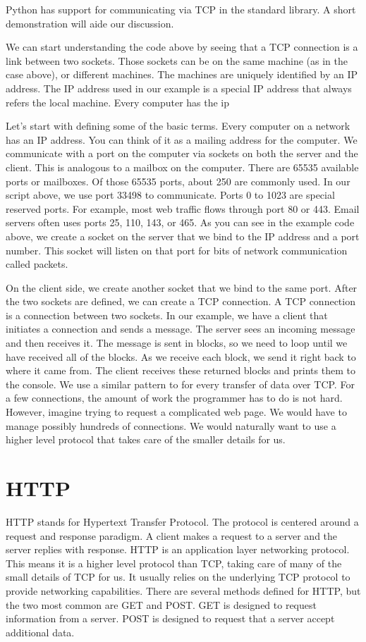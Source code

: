 Python has support for communicating via TCP in the standard library.
A short demonstration will aide our discussion.




We can start understanding the code above by seeing that a TCP connection is a link between two sockets.
Those sockets can be on the same machine (as in the case above), or different machines.
The machines are uniquely identified by an IP address.
The IP address used in our example is a special IP address that always refers the local machine.
Every computer has the ip


Let's start with defining some of the basic terms.
Every computer on a network has an IP address.
You can think of it as a mailing address for the computer.
We communicate with a port on the computer via sockets on both the server and the client.
This is analogous to a mailbox on the computer.
There are 65535 available ports or mailboxes.
Of those 65535 ports, about 250 are commonly used.
In our script above, we use port 33498 to communicate.
Ports 0 to 1023 are special reserved ports.
For example, most web traffic flows through port 80 or 443.
Email servers often uses ports 25, 110, 143, or 465.
As you can see in the example code above, we create a socket on the server that we bind to the IP address and a port number.
This socket will listen on that port for bits of network communication called packets.

On the client side, we create another socket that we bind to the same port.
After the two sockets are defined, we can create a TCP connection.
A TCP connection is a connection between two sockets.
In our example, we have a client that initiates a connection and sends a message.
The server sees an incoming message and then receives it.
The message is sent in blocks, so we need to loop until we have received all of the blocks.
As we receive each block, we send it right back to where it came from.
The client receives these returned blocks and prints them to the console.
We use a similar pattern to for every transfer of data over TCP.
For a few connections, the amount of work the programmer has to do is not hard.
However, imagine trying to request a complicated web page.
We would have to manage possibly hundreds of connections.
We would naturally want to use a higher level protocol that takes care of the smaller details for us.

\section*{HTTP}
HTTP stands for Hypertext Transfer Protocol.
The protocol is centered around a request and response paradigm.
A client makes a request to a server and the server replies with response.
HTTP is an application layer networking protocol.
This means it is a higher level protocol than TCP, taking care of many of the small details of TCP for us.
It usually relies on the underlying TCP protocol to provide networking capabilities.
There are several methods defined for HTTP, but the two most common are GET and POST.
GET is designed to request information from a server.
POST is designed to request that a server accept additional data.

